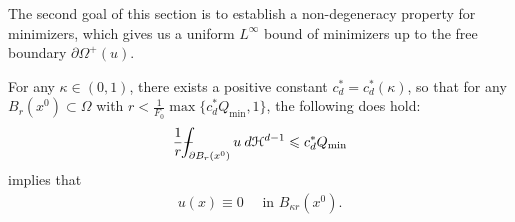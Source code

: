 \documentclass[11pt,reqno]{amsart}
\begin{document}
The second goal of this section is to establish a non-degeneracy property for minimizers, which gives us a uniform $L^{\infty}$ bound of minimizers up to the free boundary $\partial\varOmega^{+}(u)$.
\begin{proposition}\label{Proposition: non-degeneracy of minimizers}
	For any $\kappa\in(0,1)$, there exists a positive constant $c_{d}^{*}=c_{d}^{*}(\kappa)$, so that for any $B_{r}(x^{0})\subset\Omega$ with $r<\frac{1}{F_{0}}\max\{c_{d}^{*}Q_{\mathrm{min}},1\}$, the following does hold:
	\begin{align}\label{Formula: Nondegeneray}
		\frac{1}{r}\dashint_{\partial B_{r}(x^{0})}u\:d\mathcal{H}^{d-1}\leqslant c_{d}^{*}Q_{\mathrm{min}}
	\end{align}
	implies that
	\begin{align*}
		u(x)\equiv0\quad\text{ in }B_{\kappa r}(x^{0}).
	\end{align*}
\end{proposition}
\end{document}
